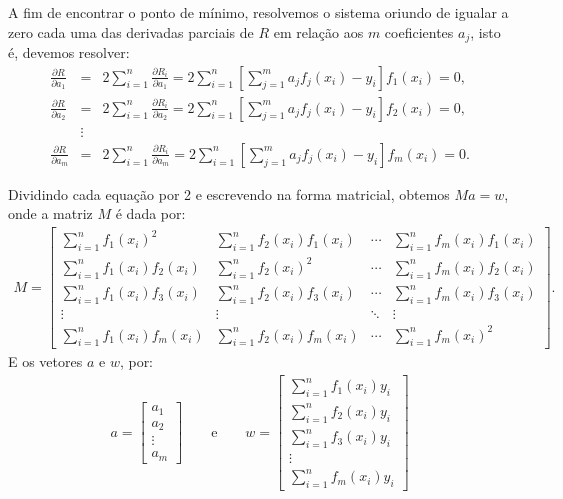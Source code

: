 A fim de encontrar o ponto de mínimo, resolvemos o sistema oriundo de igualar a zero cada uma das derivadas parciais de $R$ em relação aos $m$ coeficientes $a_j$, isto é, devemos resolver:
\begin{eqnarray*}
\frac{\partial R}{\partial a_1} &=& 2 \sum_{i=1}^n \frac{\partial R_i}{\partial a_1} = 2\sum_{i=1}^n \left[\sum_{j=1}^m a_jf_j(x_i)-y_i\right] f_1(x_i)=0,\\
\frac{\partial R}{\partial a_2} &=& 2 \sum_{i=1}^n \frac{\partial R_i}{\partial a_2}=2\sum_{i=1}^n \left[\sum_{j=1}^m a_jf_j(x_i)-y_i\right] f_2(x_i)=0,\\
&\vdots&\\
\frac{\partial R}{\partial a_m} &=& 2 \sum_{i=1}^n \frac{\partial R_i}{\partial a_m}= 2\sum_{i=1}^n \left[\sum_{j=1}^m a_jf_j(x_i)-y_i\right] f_m(x_i)=0.
\end{eqnarray*}

Dividindo cada equação por 2 e escrevendo na forma matricial, obtemos $Ma=w$, onde a matriz $M$ é dada por:
\begin{eqnarray*}
M = \begin{bmatrix}
\sum\limits_{i=1}^n f_1(x_i)^2 & \sum\limits_{i=1}^n f_2(x_i) f_1(x_i) & \!\cdots\! & \sum\limits_{i=1}^n f_m(x_i) f_1(x_i)\\
\sum\limits_{i=1}^n f_1(x_i) f_2(x_i)&\sum\limits_{i=1}^n f_2(x_i)^2 & \!\cdots\! & \sum\limits_{i=1}^n f_m(x_i)  f_2(x_i)\\
\sum\limits_{i=1}^n f_1(x_i) f_3(x_i)&\sum\limits_{i=1}^n f_2(x_i)f_3(x_i) & \!\cdots\! & \sum\limits_{i=1}^n f_m(x_i)  f_3(x_i)\\
\vdots & \vdots & \ddots & \vdots\\
\sum\limits_{i=1}^n f_1(x_i) f_m(x_i)&\sum\limits_{i=1}^n f_2(x_i)f_m(x_i) & \!\cdots\! & \sum\limits_{i=1}^n f_m(x_i)  ^2
\end{bmatrix}.
\end{eqnarray*}
E os vetores $a$ e $w$, por:
\begin{eqnarray*}
a=\left[
\begin{array}{c}
a_1\\
a_2\\
\vdots\\
a_m
\end{array}
\right]\qquad\text{e}\qquad w=\left[\begin{array}{c}
\sum\limits_{i=1}^n f_1(x_i) y_i\\
\sum\limits_{i=1}^n f_2(x_i) y_i\\
\sum\limits_{i=1}^n f_3(x_i) y_i\\
\vdots\\
\sum\limits_{i=1}^n f_m(x_i) y_i
\end{array}
\right]
\end{eqnarray*}

